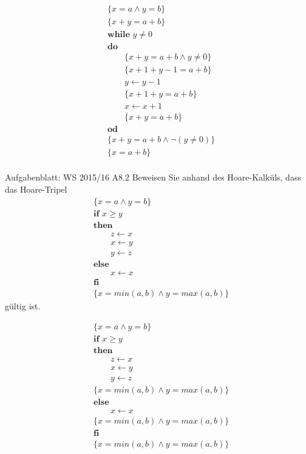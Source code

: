 \begin{frame}
  \begin{align*}
    &\{x=a \land y=b\}  \\
    &\{ x+y=a+b \} \\
    &\textbf{while } y\not=0  \\
    &\textbf{do } \\
    &\qquad\{ x+y=a+b \land y\not=0 \} \\
    &\qquad\{ x+1+y-1=a+b \} \\
    &\qquad y \gets y-1 \\
    &\qquad\{ x+1+y=a+b \} \\
    &\qquad x \gets x+1 \\
    &\qquad\{ x+y=a+b \} \\
    &\textbf{od } \\
    &\{ x+y=a+b \land \lnot(y\not=0) \} \\
    &\{x=a+b\} \\
  \end{align*}
\end{frame}

\begin{frame}{Aufgabenblatt: WS 2015/16 A8.2}
  Beweisen Sie anhand des Hoare-Kalküls, dass das Hoare-Tripel
  \begin{align*}
    &\{x=a\land y=b\}\\
    &\textbf{if } x\ge y\\
    &\textbf{then}\\
    & \qquad z\leftarrow x\\
    & \qquad x\leftarrow y\\
    & \qquad y\leftarrow z\\
    &\textbf{else}\\
    & \qquad x\leftarrow x\\
    &\textbf{fi}\\
    &\{x=min(a,b)\land y=max(a,b)\}
  \end{align*}
  gültig ist.
\end{frame}

\begin{frame}
  \begin{align*}
    &\{x=a\land y=b\}\\
    &\textbf{if } x\ge y\\
    &\textbf{then}\\
    & \qquad z\leftarrow x\\
    & \qquad x\leftarrow y\\
    & \qquad y\leftarrow z\\
    &\{x=min(a,b)\land y=max(a,b)\}\\
    &\textbf{else}\\
    & \qquad x\leftarrow x\\
    &\{x=min(a,b)\land y=max(a,b)\}\\
    &\textbf{fi}\\
    &\{x=min(a,b)\land y=max(a,b)\}
  \end{align*}
\end{frame}

